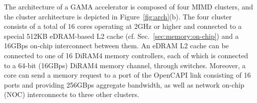 
The architecture of a GAMA accelerator is composed of four MIMD clusters, and the cluster architecture is depicted in Figure~\ref{fig:arch}(b).
The four cluster consists of a total of 16 cores operating at 2GHz or higher and connected to a special 512KB eDRAM-based L2 cache (cf. Sec.~\ref{sec:memory:on-chip}) and a 16GBps on-chip interconnect between them. 
An eDRAM L2 cache can be connected to one of 16 DiRAM4 memory controllers, each of which is connected to a 64-bit (16GBps) DiRAM4 memory channel, through switches.
Moreover, a core can send a memory request to a port of the OpenCAPI link consisting of 16 ports and providing 256GBps aggregate bandwidth, as well as network on-chip (NOC) interconnects to three other clusters.  


\begin{comment}
\noindent
\textbf{Coarse-Grained Reconfigurable Processing Engine:} 
To efficiently execute graph primitives, we aim to architect the CGR-Core with a coarse-grain reconfigurable (CGR) array of execution units. 
This architecture based on a spatial data-flow architecture can significantly reduce the overhead of instruction fetches and data transfers within an accelerator, as many operations for a complex graph primitive function can be executed by a single (macro) instruction and a few registerfile and/or cache accesses. 
Furthermore, for streaming graph analytics, it is very inefficient to apply computations and changes to individual vertices as they arrive. 
We propose the update buffer to allow CGR-Core to bulk commit messages bound for (or coming from) multiple vertices in a single phase.
\end{comment}



